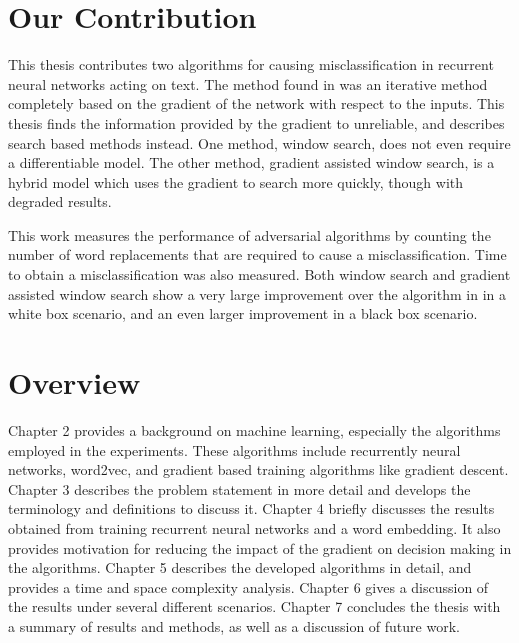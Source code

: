 \section{Our Contribution}
This thesis contributes two algorithms for causing misclassification in recurrent neural networks acting on text.  The method found in \cite{np16} was an iterative method completely based on the gradient of the network with respect to the inputs.  This thesis finds the information provided by the gradient to unreliable, and describes search based methods instead.  One method, window search, does not even require a differentiable model.  The other method, gradient assisted window search, is a hybrid model which uses the gradient to search more quickly, though with degraded results.  

This work measures the performance of adversarial algorithms by counting the number of word replacements that are required to cause a misclassification.  Time to obtain a misclassification was also measured.  Both window search and gradient assisted window search show a very large improvement over the algorithm in \cite{np16} in a white box scenario, and an even larger improvement in a black box scenario.

\section{Overview}
Chapter 2 provides a background on machine learning, especially the algorithms employed in the experiments.  These algorithms include recurrently neural networks, word2vec, and gradient based training algorithms like gradient descent.  Chapter 3 describes the problem statement in more detail and develops the terminology and definitions to discuss it.  Chapter 4 briefly discusses the results obtained from training recurrent neural networks and a word embedding.  It also provides motivation for reducing the impact of the gradient on decision making in the algorithms.  Chapter 5 describes the developed algorithms in detail, and provides a time and space complexity analysis.  Chapter 6 gives a discussion of the results under several different scenarios.  Chapter 7 concludes the thesis with a summary of results and methods, as well as a discussion of future work.

